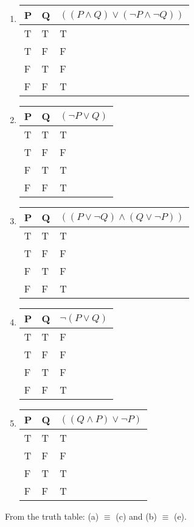     \begin{solution}
        \begin{enumerate}[label=(\alph*)]
            \item {
                \begin{tabular}[c]{l l | l}
                    P & Q & $((P \wedge Q) \vee (\neg P \wedge \neg Q))$ \\ \hline
                    T & T & T \\
                    T & F & F \\
                    F & T & F \\
                    F & F & T
                \end{tabular}
            }
            \item {
                \begin{tabular}[c]{l l | l}
                    P & Q & $(\neg P \vee Q)$ \\ \hline
                    T & T & T \\
                    T & F & F \\
                    F & T & T \\
                    F & F & T
                \end{tabular}
            }
            \item {
                \begin{tabular}[c]{l l | l}
                    P & Q & $((P \vee \neg Q) \wedge (Q \vee \neg P))$ \\ \hline
                    T & T & T \\
                    T & F & F \\
                    F & T & F \\
                    F & F & T
                \end{tabular}
            }
            \item {
                \begin{tabular}[c]{l l | l}
                    P & Q & $\neg(P \vee Q)$ \\ \hline
                    T & T & F \\
                    T & F & F \\
                    F & T & F \\
                    F & F & T
                \end{tabular}
            }
            \item {
                \begin{tabular}[c]{l l | l}
                    P & Q & $((Q \wedge P) \vee \neg P)$ \\ \hline
                    T & T & T \\
                    T & F & F \\
                    F & T & T \\
                    F & F & T
                \end{tabular}
            }
        \end{enumerate}
        From the truth table: (a) $\equiv$ (c) and (b) $\equiv$ (e).
    \end{solution}

